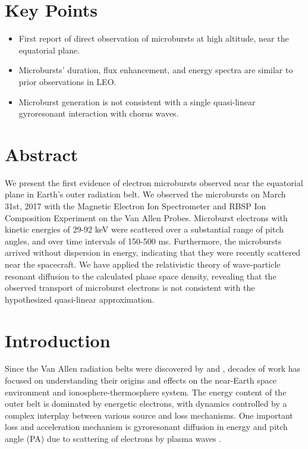 \newpage

\section{Key Points}
\begin{itemize}
\item First report of direct observation of microbursts at high altitude, near the equatorial plane.
\item Microbursts' duration, flux enhancement, and energy spectra are similar to prior observations in LEO.
\item Microburst generation is not consistent with a single quasi-linear gyroresonant interaction with chorus waves.
\end{itemize}

\section{Abstract}
We present the first evidence of electron microbursts observed near the equatorial plane in Earth's outer radiation belt. We observed the microbursts on March 31st, 2017 with the Magnetic Electron Ion Spectrometer and RBSP Ion Composition Experiment on the Van Allen Probes. Microburst electrons with kinetic energies of 29-92 keV were scattered over a substantial range of pitch angles, and over time intervals of 150-500 ms. Furthermore, the microbursts arrived without dispersion in energy, indicating that they were recently scattered near the spacecraft. We have applied the relativistic theory of wave-particle resonant diffusion to the calculated phase space density, revealing that the observed transport of microburst electrons is not consistent with the hypothesized quasi-linear approximation.

%
%
\section{Introduction}\label{Intro} %
Since the Van Allen radiation belts were discovered by \citet{Allen1959} and \citet{Vernov1960}, decades of work has focused on understanding their origins and effects on the near-Earth space environment and ionosphere-thermosphere system. The energy content of the outer belt is dominated by energetic electrons, with dynamics controlled by a complex interplay between various source and loss mechanisms. One important loss and acceleration mechanism is gyroresonant diffusion in energy and pitch angle (PA) due to scattering of electrons by plasma waves \citep[e.g.][]{Thorne1980, Walker1993, Summers1998, Meredith2002, Horne2003, Thorne2005, Millan2007, Bortnik2008}.

